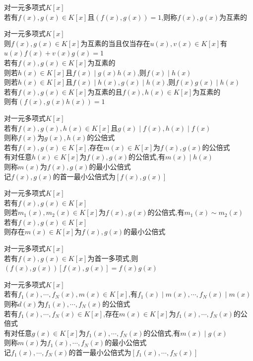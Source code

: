 \begin{dingyi}
对一元多项式$K[x]$\\
若有$f(x),g(x)\in K[x]$且$(f(x),g(x))=1$,则称$f(x),g(x)$为互素的
\end{dingyi}

\begin{dingli}
对一元多项式$K[x]$\\
则$f(x),g(x)\in K[x]$为互素的当且仅当存在$u(x),v(x)\in K[x]$有$u(x)f(x)+v(x)g(x)=1$\\
若有$f(x),g(x)\in K[x]$为互素的\\
则若$h(x)\in K[x]$且$f(x)\mid g(x)h(x)$,则$f(x)\mid h(x)$\\
则若$h(x)\in K[x]$且$f(x)\mid h(x),g(x)\mid h(x)$,则$f(x)g(x)\mid h(x)$\\
若有$f(x),g(x)\in K[x]$为互素的且$f(x),h(x)\in K[x]$为互素的\\
则有$(f(x),g(x)h(x))=1$
\end{dingli}

\begin{dingyi}
对一元多项式$K[x]$\\
若有$f(x),g(x),h(x)\in K[x]$且$g(x)\mid f(x),h(x)\mid f(x)$\\
则称$f(x)$为$g(x),h(x)$的公倍式\\
若有$f(x),g(x)\in K[x]$,存在$m(x)\in K[x]$为$f(x),g(x)$的公倍式\\
有对任意$h(x)\in K[x]$为$f(x),g(x)$的公倍式,有$m(x)\mid h(x)$\\
则称$m(x)$为$f(x),g(x)$的最小公倍式\\
记$f(x),g(x)$的首一最小公倍式为$[f(x),g(x)]$
\end{dingyi}

\begin{dingli}
对一元多项式$K[x]$\\
若有$f(x),g(x)\in K[x]$\\
则若$m_1(x),m_2(x)\in K[x]$为$f(x),g(x)$的公倍式,有$m_1(x)\sim m_2(x)$\\
若有$f(x),g(x)\in K[x]$\\
则存在$m(x)\in K[x]$为$f(x),g(x)$的最小公倍式
\end{dingli}

\begin{dingli}
对一元多项式$K[x]$\\
若有$f(x),g(x)\in K[x]$为首一多项式,则$(f(x),g(x))[f(x),g(x)]=f(x)g(x)$
\end{dingli}

\begin{dingyi}
对一元多项式$K[x]$\\
若有$f_1(x),\cdots,f_N(x),m(x)\in K[x]$,有$f_1(x)\mid m(x),\cdots,f_N(x)\mid m(x)$\\
则称$d(x)$为$f_1(x),\cdots,f_N(x)$的公倍式\\
若有$f_1(x),\cdots,f_N(x)\in K[x]$,存在$m(x)\in K[x]$为$f_1(x),\cdots,f_N(x)$的公倍式\\
有对任意$g(x)\in K[x]$为$f_1(x),\cdots,f_N(x)$的公倍式,有$m(x)\mid g(x)$\\
则称$m(x)$为$f_1(x),\cdots,f_N(x)$的最小公倍式\\
记$f_1(x),\cdots,f_N(x)$的首一最小公倍式为$[f_1(x),\cdots,f_N(x)]$
\end{dingyi}

